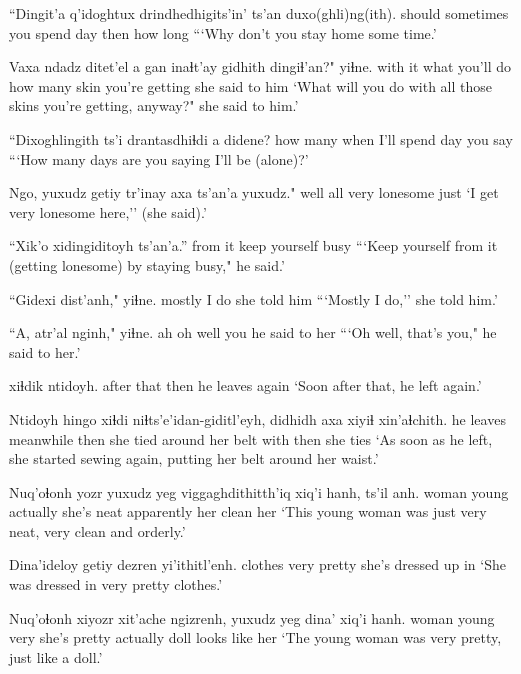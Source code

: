 \documentclass[12pt]{article}
\begin{document}
\gll ``Dingit'a q'idoghtux drindhedhigits'in' ts'an duxo(ghli)ng(ith).
should sometimes {you spend day} then {how long}
\glt ```Why don't you stay home some time.' 
\glend

\gll Vaxa ndadz ditet'el a {gan inaɬt'ay} gidhith dingiɬ'an?" yiɬne. 
{with it} what {you'll do} {} {how many} skin {you're getting} {she said to him}
\glt `What will you do with all those skins you're getting, anyway?" she said to him.'
\glend

\gll ``Dixoghlingith ts'i drantasdhiɬdi a didene?
{how many} {} {when I'll spend day} {} {you say} 
\glt ```How many days are you saying I'll be (alone)?' 
\glend

\gll Ngo, yuxudz getiy {tr'inay axa} ts'an'a yuxudz." 
well all very {lonesome} {} just
\glt `I get very lonesome here,'' (she said).'
\glend

\gll ``Xik'o xidingiditoyh ts'an'a.'' 
{from it} {keep yourself busy} {} 
\glt ```Keep yourself from it (getting lonesome) by staying busy," he said.'
\glend

\gll ``Gidexi dist'anh," yiɬne.
mostly {I do} {she told him}
\glt ```Mostly I do,'' she told him.'
\glend

\gll ``A, atr'al nginh," yiɬne.  
ah {oh well} you {he said to her}
\glt ```Oh well, that's you," he said to her.'
\glend

 xiɬdik ntidoyh.
{after that} then {he leaves again}
\glt `Soon after that, he left again.'
\glend

\gll Ntidoyh hingo xiɬdi niɬts'e'idan-giditl'eyh, didhidh axa xiyiɬ xin'aɬchith.
{he leaves} meanwhile then {she tied around} {her belt} with then {she ties}
\glt `As soon as he left, she started sewing again, putting her belt around her waist.'
\glend

\gll Nuq'oɬonh yozr {yuxudz yeg} viggaghdithitth'iq xiq'i hanh, ts'il anh.
woman young actually {she's neat} apparently her clean her
\glt `This young woman was just very neat, very clean and orderly.'
\glend

\gll Dina'ideloy getiy dezren yi'ithitl'enh.
clothes very pretty {she's dressed up in}
\glt `She was dressed in very pretty clothes.'
\glend

\gll Nuq'oɬonh xiyozr {xit'ache} ngizrenh, {yuxudz yeg} dina' xiq'i hanh.
woman young very {she's pretty} actually doll {looks like} her
\glt `The young woman was very pretty, just like a doll.'
\glend
\end{document}
